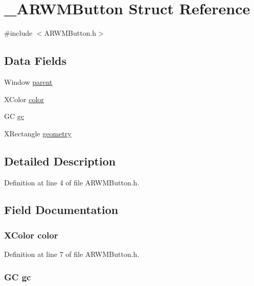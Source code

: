 \hypertarget{struct___a_r_w_m_button}{
\section{\_\-ARWMButton Struct Reference}
\label{struct___a_r_w_m_button}
}


{\ttfamily \#include $<$ARWMButton.h$>$}

\subsection*{Data Fields}
\begin{DoxyCompactItemize}
\item 
Window \hyperlink{struct___a_r_w_m_button_a9222d5f7d6d375ac2c052eefe78af8a3}{parent}
\item 
XColor \hyperlink{struct___a_r_w_m_button_a0343b40c96673c1e5629071e4e568ec0}{color}
\item 
GC \hyperlink{struct___a_r_w_m_button_a5da9d24666f1955a9b5ce3d2583b823a}{gc}
\item 
XRectangle \hyperlink{struct___a_r_w_m_button_aac33c74a9e108df3ab284cf3a1cc8e21}{geometry}
\end{DoxyCompactItemize}


\subsection{Detailed Description}


Definition at line 4 of file ARWMButton.h.



\subsection{Field Documentation}
\hypertarget{struct___a_r_w_m_button_a0343b40c96673c1e5629071e4e568ec0}{
\subsubsection[{color}]{\setlength{\rightskip}{0pt plus 5cm}XColor {\bf color}}}
\label{struct___a_r_w_m_button_a0343b40c96673c1e5629071e4e568ec0}


Definition at line 7 of file ARWMButton.h.

\hypertarget{struct___a_r_w_m_button_a5da9d24666f1955a9b5ce3d2583b823a}{
\subsubsection[{gc}]{\setlength{\rightskip}{0pt plus 5cm}GC {\bf gc}}}
\label{struct___a_r_w_m_button_a5da9d24666f1955a9b5ce3d2583b823a}


